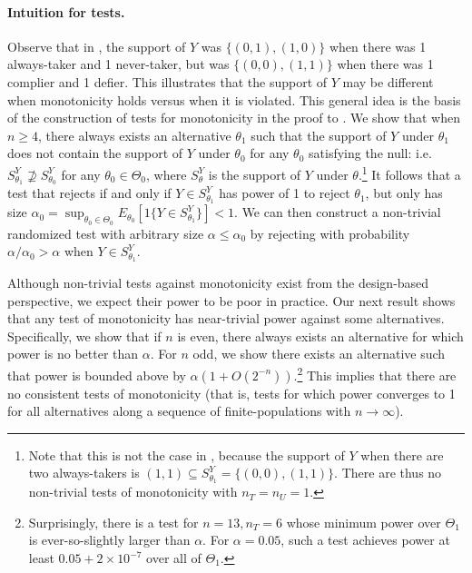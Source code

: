 \documentclass[12pt,reqno]{amsart}
\theoremstyle{theorem}
\theoremstyle{definition}
\newcommand{\0}{\mathbf{0}}
\newcommand{\1}{\mathbf{1}}
\begin{document}
\paragraph{\textbf{Intuition for tests.}} Observe that in , the support of $Y$ was $\{(0,1), (1,0)\}$ when there was 1 always-taker and 1 never-taker, but was $\{(0,0),(1,1)\}$ when there was 1 complier and 1 defier. This illustrates that the support of $Y$ may be different when monotonicity holds versus when it is violated. This general idea is the basis of the construction of tests for monotonicity in the proof to . We show that when $n \geq 4$, there always exists an alternative $\theta_1$ such that the support of $Y$ under $\theta_1$ does not contain the support of $Y$ under $\theta_0$ for any $\theta_0$ satisfying the null: i.e. $S^Y_{\theta_1} \not\supseteq S^Y_{\theta_0}$ for any $\theta_0 \in \Theta_0$, where $S^Y_\theta$ is the support of $Y$ under $\theta$.\footnote{Note that this is not the case in , because the support of $Y$ when there are two always-takers is $(1,1) \subseteq S^Y_{\theta_1} = \{(0,0),(1,1)\}$. There are thus no non-trivial tests of monotonicity with $n_T = n_U = 1$.} It follows that a test that rejects if and only if $Y \in S^Y_{\theta_1}$ has power of 1 to reject $\theta_1$, but only has size $\alpha_0 = \sup_{\theta_0 \in \Theta_0} E_{\theta_0}[ 1\{ Y \in S^Y_{\theta_1} \} ] < 1$. We can then construct a non-trivial randomized test with arbitrary size $\alpha \leq \alpha_0$ by rejecting with probability $\alpha/\alpha_0 > \alpha$ when $Y \in S^Y_{\theta_1}$. 


Although non-trivial tests against monotonicity exist from the design-based perspective,
we expect their power to be poor in practice. Our next result shows that any test of
monotonicity has near-trivial power against some alternatives. Specifically, we show that if $n$ is even, there always exists an alternative for which power is no better than $\alpha$. For $n$ odd, we show there exists an alternative such that power is bounded above by $\alpha (1+ O(2^{-n}))$.\footnote{Surprisingly, there is a test for $n=13, n_T=6$ whose minimum power over $\Theta_1$ is ever-so-slightly larger than $\alpha$. For $\alpha=0.05$, such a test achieves power at least $0.05 + 2 \times 10^{-7}$ over all of $\Theta_1$.} This implies that there are no consistent tests of monotonicity (that is, tests for which power converges to 1 for all alternatives along a sequence of finite-populations with $n \to \infty$). 
\end{document}
